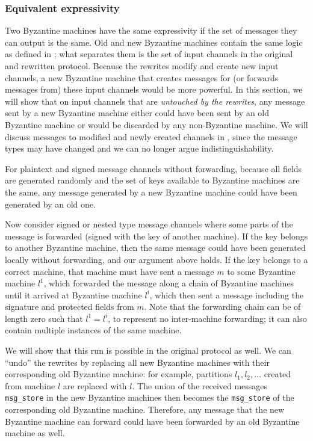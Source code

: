 \subsubsection{Equivalent expressivity}
\label{sec:equivalent-expressivity}
Two Byzantine machines have the same expressivity if the set of messages they can output is the same.
Old and new Byzantine machines contain the same logic as defined in ; what separates them is the set of input channels in the original and rewritten protocol.
Because the rewrites modify and create new input channels, a new Byzantine machine that creates messages for (or forwards messages from) these input channels would be more powerful.
In this section, we will show that on input channels that are \emph{untouched by the rewrites}, any message sent by a new Byzantine machine either could have been sent by an old Byzantine machine or would be discarded by any non-Byzantine machine.
We will discuss messages to modified and newly created channels in , since the message types may have changed and we can no longer argue indistinguishability.


For plaintext and signed message channels without forwarding, because all fields are generated randomly and the set of keys available to Byzantine machines are the same, any message generated by a new Byzantine machine could have been generated by an old one.

Now consider signed or nested type message channels where some parts of the message is forwarded (signed with the key of another machine).
If the key belongs to another Byzantine machine, then the same message could have been generated locally without forwarding, and our argument above holds.
If the key belongs to a correct machine, that machine must have sent a message $m$ to some Byzantine machine $l^1$, which forwarded the message along a chain of Byzantine machines until it arrived at Byzantine machine $l^i$, which then sent a message including the signature and protected fields from $m$.
Note that the forwarding chain can be of length zero such that $l^1 = l^i$, to represent no inter-machine forwarding; it can also contain multiple instances of the same machine.

We will show that this run is possible in the original protocol as well.
We can ``undo'' the rewrites by replacing all new Byzantine machines with their corresponding old Byzantine machine: for example, partitions $l_1, l_2, \ldots$ created from machine $l$ are replaced with $l$.
The union of the received messages \texttt{msg\_store} in the new Byzantine machines then becomes the \texttt{msg\_store} of the corresponding old Byzantine machine.
Therefore, any message that the new Byzantine machine can forward could have been forwarded by an old Byzantine machine as well.

